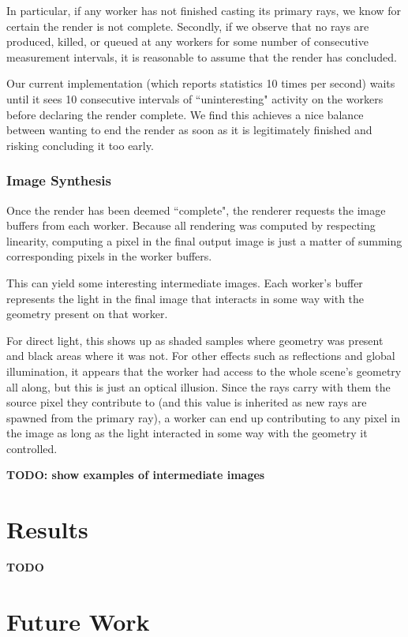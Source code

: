 \documentclass[12pt]{ucthesis}
\begin{document}
In particular, if any worker has not finished casting its primary rays, we
know for certain the render is not complete. Secondly, if we observe that no
rays are produced, killed, or queued at any workers for some number of
consecutive measurement intervals, it is reasonable to assume that the render
has concluded.

Our current implementation (which reports statistics 10 times per second)
waits until it sees 10 consecutive intervals of ``uninteresting" activity on
the workers before declaring the render complete. We find this achieves a nice
balance between wanting to end the render as soon as it is legitimately
finished and risking concluding it too early.

\subsection{Image Synthesis}
\label{synthesis}

Once the render has been deemed ``complete", the renderer requests the image
buffers from each worker. Because all rendering was computed by respecting
linearity, computing a pixel in the final output image is just a matter
of summing corresponding pixels in the worker buffers.

This can yield some interesting intermediate images. Each worker's buffer
represents the light in the final image that interacts in some way with the
geometry present on that worker.

For direct light, this shows up as shaded samples where geometry was present
and black areas where it was not. For other effects such as reflections and
global illumination, it appears that the worker had access to the whole scene's
geometry all along, but this is just an optical illusion. Since the rays
carry with them the source pixel they contribute to (and this value is inherited
as new rays are spawned from the primary ray), a worker can end up contributing
to any pixel in the image as long as the light interacted in some way with the
geometry it controlled.

\textbf{TODO: show examples of intermediate images}

\chapter{Results}
\label{results}

\textbf{TODO}

\chapter{Future Work}
\label{futurework}
\end{document}

